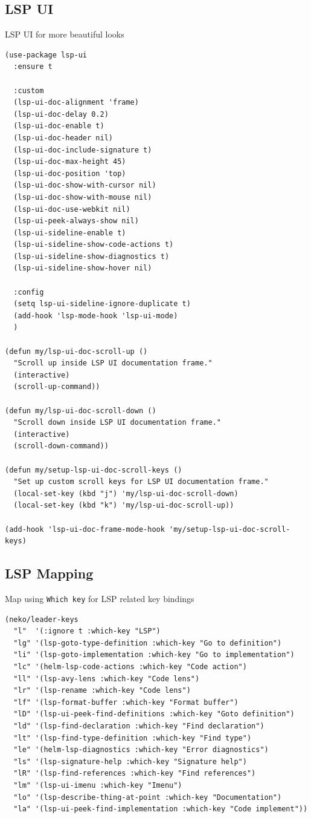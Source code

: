 \documentclass[11pt]{article}
\begin{document}
\subsection{LSP UI}
\label{sec:org07b3225}

LSP UI for more beautiful looks

\begin{verbatim}
(use-package lsp-ui
  :ensure t

  :custom
  (lsp-ui-doc-alignment 'frame)
  (lsp-ui-doc-delay 0.2)
  (lsp-ui-doc-enable t)
  (lsp-ui-doc-header nil)
  (lsp-ui-doc-include-signature t)
  (lsp-ui-doc-max-height 45)
  (lsp-ui-doc-position 'top)
  (lsp-ui-doc-show-with-cursor nil)
  (lsp-ui-doc-show-with-mouse nil)
  (lsp-ui-doc-use-webkit nil)
  (lsp-ui-peek-always-show nil)
  (lsp-ui-sideline-enable t)
  (lsp-ui-sideline-show-code-actions t)
  (lsp-ui-sideline-show-diagnostics t)
  (lsp-ui-sideline-show-hover nil)

  :config
  (setq lsp-ui-sideline-ignore-duplicate t)
  (add-hook 'lsp-mode-hook 'lsp-ui-mode)
  )

(defun my/lsp-ui-doc-scroll-up ()
  "Scroll up inside LSP UI documentation frame."
  (interactive)
  (scroll-up-command))

(defun my/lsp-ui-doc-scroll-down ()
  "Scroll down inside LSP UI documentation frame."
  (interactive)
  (scroll-down-command))

(defun my/setup-lsp-ui-doc-scroll-keys ()
  "Set up custom scroll keys for LSP UI documentation frame."
  (local-set-key (kbd "j") 'my/lsp-ui-doc-scroll-down)
  (local-set-key (kbd "k") 'my/lsp-ui-doc-scroll-up))

(add-hook 'lsp-ui-doc-frame-mode-hook 'my/setup-lsp-ui-doc-scroll-keys)

\end{verbatim}

\subsection{LSP Mapping}
\label{sec:org4b39e42}

Map using \texttt{Which key} for LSP related key bindings

\begin{verbatim}
(neko/leader-keys
  "l"  '(:ignore t :which-key "LSP")
  "lg" '(lsp-goto-type-definition :which-key "Go to definition")
  "li" '(lsp-goto-implementation :which-key "Go to implementation")
  "lc" '(helm-lsp-code-actions :which-key "Code action")
  "ll" '(lsp-avy-lens :which-key "Code lens")
  "lr" '(lsp-rename :which-key "Code lens")
  "lf" '(lsp-format-buffer :which-key "Format buffer")
  "lD" '(lsp-ui-peek-find-definitions :which-key "Goto definition")
  "ld" '(lsp-find-declaration :which-key "Find declaration")
  "lt" '(lsp-find-type-definition :which-key "Find type")
  "le" '(helm-lsp-diagnostics :which-key "Error diagnostics")
  "ls" '(lsp-signature-help :which-key "Signature help")
  "lR" '(lsp-find-references :which-key "Find references")
  "lm" '(lsp-ui-imenu :which-key "Imenu")
  "lo" '(lsp-describe-thing-at-point :which-key "Documentation")
  "la" '(lsp-ui-peek-find-implementation :which-key "Code implement"))


\end{verbatim}
\end{document}
